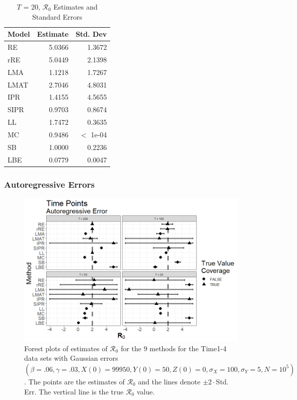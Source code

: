 \documentclass[12pt]{article}
\newcommand{\xxsir}{\ensuremath{9} } %
\newcommand{\rr}{\ensuremath{\mathcal{R}_0}}
\begin{document}
\begin{table}[H]
	\centering
	\begin{tabular}[t]{l|r|r}
		\hline
		Model & Estimate & Std. Dev\\
		\hline
		RE & 5.0366 & 1.3672\\
		\hline
		rRE & 5.0449 & 2.1398\\
		\hline
		LMA & 1.1218 & 1.7267\\
		\hline
		LMAT & 2.7046 & 4.8031\\
		\hline
		IPR & 1.4155 & 4.5655\\
		\hline
		SIPR & 0.9703 & 0.8674\\
		\hline
		LL & 1.7472 & 0.3635\\
		\hline
		MC & 0.9486 & $<$ 1e-04\\
		\hline
		SB & 1.0000 & 0.2236\\
		\hline
		LBE & 0.0779 & 0.0047\\
		\hline
	\end{tabular}
	\caption{$T$ = 20, $\rr$ Estimates and Standard Errors}
\end{table}

\subsubsection{Autoregressive Errors}
\begin{figure}[H]
	\centering
	\includegraphics[scale=0.5]{images/time_ar.tiff}
	\caption{Forest plots of estimates of $\rr$ for the \xxsir methods for the Time1-4 data sets with Gaussian errors $(\beta=.06, \gamma=.03, X(0)=99950, Y(0)=50, Z(0)=0, \sigma_X=100, \sigma_Y=5, N=10^5)$.  The points are the estimates of $\rr$ and the lines denote $\pm 2\cdot $Std. Err.  The vertical line is the true $\rr$ value.}
\end{figure}
\end{document}

